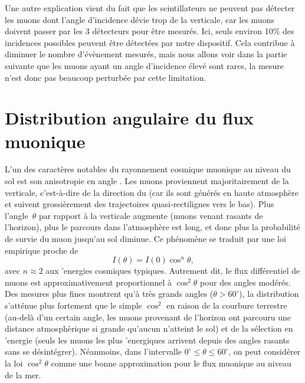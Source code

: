 \documentclass[a4paper,12pt,twoside]{article}
\begin{document}
Une autre explication vient du fait que les scintillateurs ne peuvent pas détecter les muons dont l’angle d’incidence dévie trop de la verticale, car les muons doivent passer par les 3 détecteurs pour être mesurés. Ici, seuls environ 10\% des incidences possibles peuvent être détectées par notre dispositif. Cela contribue à diminuer le nombre d’évènement mesurés, mais nous allons voir dans la partie suivante que les muons ayant un angle d’incidence élevé sont rares, la mesure n’est donc pas beaucoup perturbée par cette limitation.

\section{Distribution angulaire du flux muonique}
L'un des caract\`eres notables du rayonnement cosmique muonique au niveau du sol est son anisotropie en angle . Les muons proviennent majoritairement de la verticale, c'est-\`a-dire de la direction du  (car ils sont g\'en\'er\'es en haute atmosph\`ere et suivent grossi\`erement des trajectoires quasi-rectilignes vers le bas). Plus l'angle~$\theta$ par rapport \`a la verticale augmente (muons venant rasants de l'horizon), plus le parcours dans l'atmosph\`ere est long, et donc plus la probabilit\'e de survie du muon jusqu'au sol diminue. Ce ph\'enom\`ene se traduit par une loi empirique proche de
\[
  I(\theta) = I(0)\cos^n\theta,
\]
avec $n \approx 2$ aux 'energies cosmiques typiques. Autrement dit, le flux diff\'erentiel de muons est approximativement proportionnel \`a $\cos^2\theta$ pour des angles mod\'er\'es. Des mesures plus fines montrent qu'\`a tr\`es grands angles ($\theta > 60^\circ$), la distribution s'att\'enue plus fortement que le simple $\cos^2$ en raison de la courbure terrestre (au-del\`a d'un certain angle, les muons provenant de l'horizon ont parcouru une distance atmosph\`erique si grande qu'aucun n'atteint le sol) et de la s\'election en 'energie (seuls les muons les plus 'energiques arrivent depuis des angles rasants sans se d\'esint\'egrer). N\'eanmoins, dans l'intervalle $0^\circ \le \theta \leq 60^\circ$, on peut consid\'erer la loi $\cos^2\theta$ comme une bonne approximation pour le flux muonique au niveau de la mer.
\end{document}
